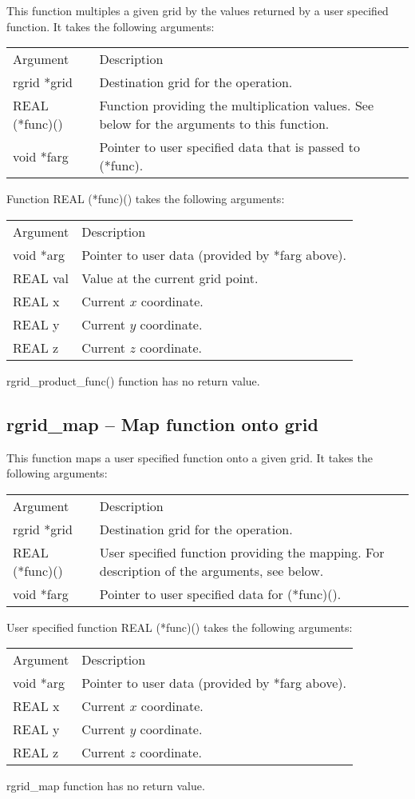 \documentclass[12pt,letterpaper]{report}
\begin{document}
This function multiples a given grid by the values returned by a user specified function. It takes the following arguments:
\begin{longtable}{p{} p{}}
Argument & Description\\
\cline{1-2}
rgrid *grid & Destination grid for the operation.\\
REAL (*func)() & Function providing the multiplication values. See below for the arguments to this function.\\
void *farg & Pointer to user specified data that is passed to (*func).\\   
\end{longtable}
\noindent
Function REAL (*func)() takes the following arguments:
\begin{longtable}{p{} p{}}
Argument & Description\\
\cline{1-2}
void *arg & Pointer to user data (provided by *farg above).\\
REAL val & Value at the current grid point.\\
REAL x & Current $x$ coordinate.\\
REAL y & Current $y$ coordinate.\\
REAL z & Current $z$ coordinate.\\
\end{longtable}
\noindent
rgrid\_product\_func() function has no return value.

\subsection{rgrid\_map -- Map function onto grid}

This function maps a user specified function onto a given grid. It takes the following arguments:
\begin{longtable}{p{} p{}}
Argument & Description\\
\cline{1-2}
rgrid *grid & Destination grid for the operation.\\
REAL (*func)() & User specified function providing the mapping. For description of the arguments, see below.\\
void *farg & Pointer to user specified data for (*func)().\\
\end{longtable}
User specified function REAL (*func)() takes the following arguments:
\begin{longtable}{p{} p{}}
Argument & Description\\
\cline{1-2}
void *arg & Pointer to user data (provided by *farg above).\\
REAL x & Current $x$ coordinate.\\
REAL y & Current $y$ coordinate.\\
REAL z & Current $z$ coordinate.\\
\end{longtable}
\noindent
rgrid\_map function has no return value.
\end{document}
